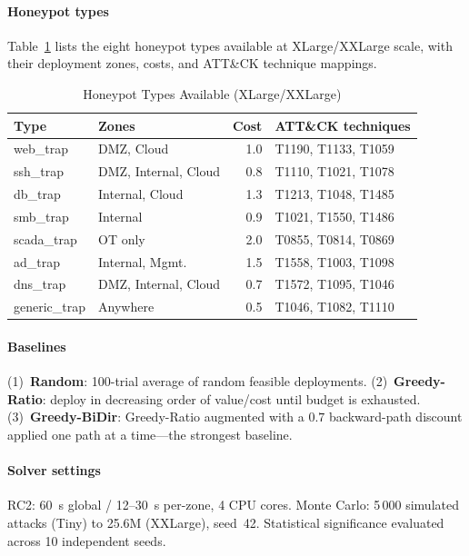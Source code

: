 \documentclass[journal]{IEEEtran}
\begin{document}
\paragraph{Honeypot types}
Table~\ref{tab:hptypes} lists the eight honeypot types available at
XLarge/XXLarge scale, with their deployment zones, costs, and
ATT\&CK technique mappings.

\begin{table}[t]
\caption{Honeypot Types Available (XLarge/XXLarge)}
\label{tab:hptypes}
\centering
\renewcommand{\arraystretch}{1.2}
\begin{tabular}{llrl}
\toprule
Type & Zones & Cost & ATT\&CK techniques \\
\midrule
web\_trap    & DMZ, Cloud           & 1.0 & T1190, T1133, T1059 \\
ssh\_trap    & DMZ, Internal, Cloud & 0.8 & T1110, T1021, T1078 \\
db\_trap     & Internal, Cloud      & 1.3 & T1213, T1048, T1485 \\
smb\_trap    & Internal             & 0.9 & T1021, T1550, T1486 \\
scada\_trap  & OT only              & 2.0 & T0855, T0814, T0869 \\
ad\_trap     & Internal, Mgmt.      & 1.5 & T1558, T1003, T1098 \\
dns\_trap    & DMZ, Internal, Cloud & 0.7 & T1572, T1095, T1046 \\
generic\_trap& Anywhere             & 0.5 & T1046, T1082, T1110 \\
\bottomrule
\end{tabular}
\end{table}

\paragraph{Baselines}
(1)~\textbf{Random}: 100-trial average of random feasible deployments.
(2)~\textbf{Greedy-Ratio}: deploy in decreasing order of value/cost
until budget is exhausted.
(3)~\textbf{Greedy-BiDir}: Greedy-Ratio augmented with a $0.7$
backward-path discount applied one path at a time---the strongest
baseline.

\paragraph{Solver settings}
RC2: 60~s global / 12--30~s per-zone, 4 CPU cores. Monte Carlo:
5\,000 simulated attacks (Tiny) to 25.6M (XXLarge), seed~42.
Statistical significance evaluated across 10 independent seeds.
\end{document}
